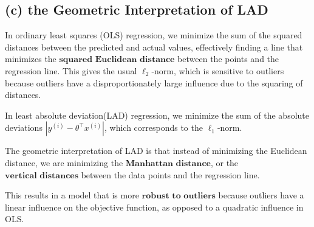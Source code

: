 \documentclass[12pt]{article}
\begin{document}
\subsection*{(c) the Geometric Interpretation of LAD}

In ordinary least squares (OLS) regression, we minimize the sum of the squared distances between the predicted and actual values, effectively finding a line that minimizes the \(\textbf{squared Euclidean distance}\) between the points and the regression line. This gives the usual \( \ell_2 \)-norm, which is sensitive to outliers because outliers have a disproportionately large influence due to the squaring of distances.

In least absolute deviation(LAD) regression, we minimize the sum of the absolute deviations \( |y^{(i)} - \theta^\top x^{(i)}| \), which corresponds to the \( \ell_1 \)-norm.

The geometric interpretation of LAD is that instead of minimizing the Euclidean distance, we are minimizing the \(\textbf{Manhattan distance}\), or the \(\textbf{vertical distances}\) between the data points and the regression line. 

This results in a model that is more \(\textbf{robust to outliers}\) because outliers have a linear influence on the objective function, as opposed to a quadratic influence in OLS.


\end{document}
